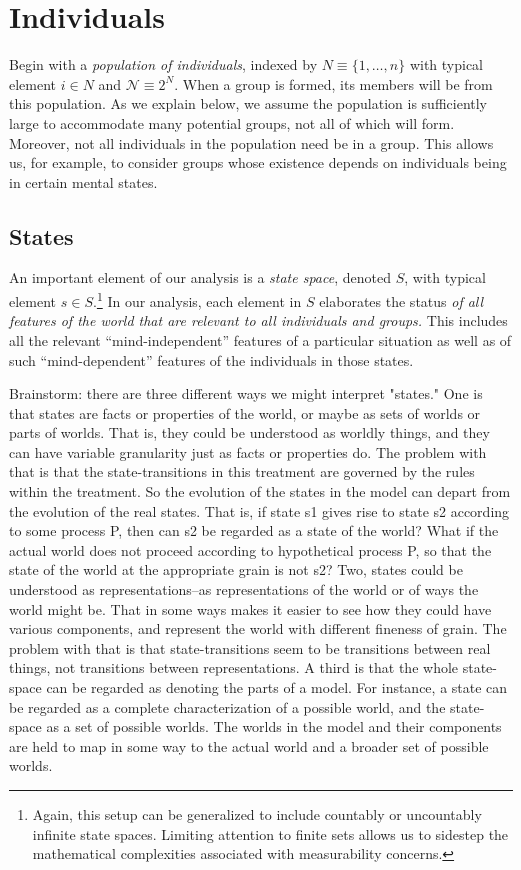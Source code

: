 \documentclass[
11pt,
titlepage,
reqno,
]{article}%
\theoremstyle{definition}
\begin{document}
	
	\section{Individuals}\label{sec: Individuals}
	
	Begin with a \textit{population of individuals}, indexed by $N\equiv \{1,\ldots,n\}$ with typical element $i\in N$ and $\mathcal{N}\equiv 2^N$. 
	When a group is formed, its members will be from this population. 
	As we explain below, we assume the population is sufficiently large to accommodate many potential groups, not all of which will form. Moreover, not all individuals in the population need be in a group. 
	This allows us, for example, to consider groups whose existence depends on individuals being in certain mental states. 
	
	
	
	\subsection{States\label{sec:states}}
	An important element of our analysis is a \textit{state space}, denoted $S$, with typical element $s\in S$.\footnote
	{
		Again, this setup can be generalized to include countably or uncountably infinite state spaces. Limiting attention to finite sets allows us to sidestep the mathematical complexities associated with measurability concerns.
	} 
	In our analysis,  each element in $S$ elaborates the status \textit{of all features of the world that are relevant to all individuals and groups.} 
	This includes all the relevant ``mind-independent'' features of a particular situation as well as of such ``mind-dependent'' features of the individuals in those states. 
	
	
	
	Brainstorm: there are three different ways we might interpret "states." One is that states are facts or properties of the world, or maybe as sets of worlds or parts of worlds. That is, they could be understood as worldly things, and they can have variable granularity just as facts or properties do. The problem with that is that the state-transitions in this treatment are governed by the rules within the treatment. So the evolution of the states in the model can depart from the evolution of the real states. That is, if state s1 gives rise to state s2 according to some process P, then can s2 be regarded as a state of the world? What if the actual world does not proceed according to hypothetical process P, so that the state of the world at the appropriate grain is not s2? Two, states could be understood as representations--as representations of the world or of ways the world might be. That in some ways makes it easier to see how they could have various components, and represent the world with different fineness of grain. The problem with that is that state-transitions seem to be transitions between real things, not transitions between representations. A third is that the whole state-space can be regarded as denoting the parts of a model. For instance, a state can be regarded as a complete characterization of a possible world, and the state-space as a set of possible worlds. The worlds in the model and their components are held to map in some way to the actual world and a broader set of possible worlds.
	
\end{document}
